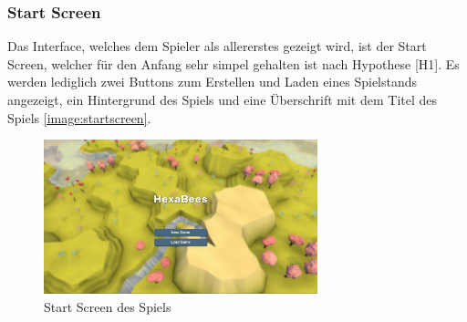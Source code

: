 \subsubsection{Start Screen}
Das Interface, welches dem Spieler als allererstes gezeigt wird, ist der Start Screen, welcher für den Anfang sehr simpel gehalten ist nach Hypothese [H1]. Es werden lediglich zwei Buttons zum Erstellen und Laden eines Spielstands angezeigt, ein Hintergrund des Spiels und eine Überschrift mit dem Titel des Spiels \autoref{image:startscreen}.

\begin{figure}
    \begin{center}
        \includegraphics[width=300px]{0.bilder/startscreen.png}
    \end{center}
    \caption{Start Screen des Spiels} \label{image:startscreen}
\end{figure}